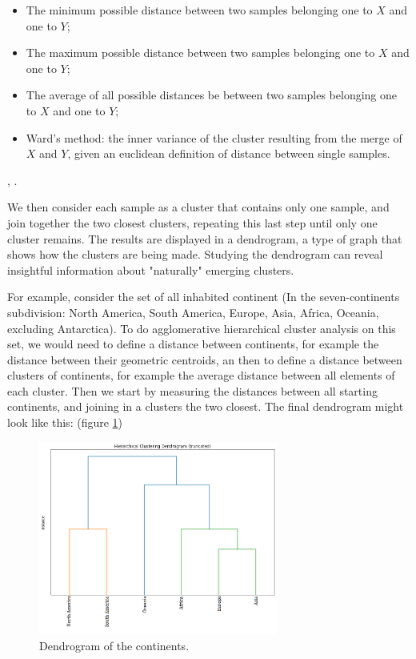 \documentclass[a4paper]{report}
\begin{document}
\begin{itemize}
	\item The minimum possible distance between two samples belonging one to $X$ and one to $Y$;
	\item The maximum possible distance between two samples belonging one to $X$ and one to $Y$;
	\item The average of all possible distances be between two samples belonging one to $X$ and one to $Y$;
	\item Ward's method: the inner variance of the cluster resulting from the merge of $X$ and $Y$, given an euclidean definition of distance between single samples.
\end{itemize}

\cite{CLUSTER}, \cite{rokach2005clustering}.

We then consider each sample as a cluster that contains only one sample, and join together the two closest clusters, repeating this last step until only one cluster remains.
The results are displayed in a dendrogram, a type of graph that shows how the clusters are being made.
Studying the dendrogram can reveal insightful information about "naturally" emerging clusters.

For example, consider the set of all inhabited continent (In the seven-continents subdivision:
North America, South America, Europe, Asia, Africa, Oceania, excluding Antarctica).
To do agglomerative hierarchical cluster analysis on this set, we would need to define a distance between continents, for example the distance between their geometric centroids, an then to define a distance between clusters of continents, for example the average distance between all elements of each cluster.
Then we start by measuring the distances between all starting continents, and joining in a clusters the two closest.
The final dendrogram might look like this:
(figure \ref{conte})

\begin{figure} [H]
\centering
\includegraphics [width=0.7\textwidth] {o/continents.png}
\caption{Dendrogram of the continents.}
\label{conte}
\end{figure}
\end{document}
